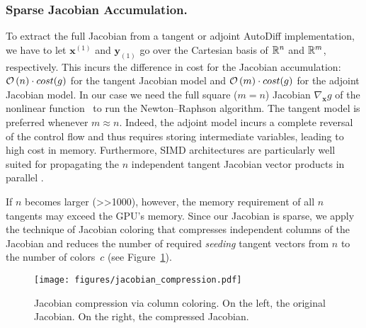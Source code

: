 \subsubsection{Sparse Jacobian Accumulation.}
To extract the full Jacobian from a tangent or adjoint AutoDiff
implementation, we have to let $\bm{x}^{(1)}$ and $\bm{y}_{(1)}$ go over the
Cartesian basis of $\mathbb{R}^n$ and $\mathbb{R}^m$, respectively. This incurs the
difference in cost for the Jacobian accumulation: $\mathcal{O}\left( n \right) \cdot cost(g)$
for the tangent Jacobian model and $\mathcal{O}\left( m \right) \cdot cost(g)$ for the adjoint
Jacobian model. In our case we need the full square ($m=n$) Jacobian $\nabla_{\bm{x}} g$
of the nonlinear function~ to run the Newton--Raphson
algorithm. The tangent model is preferred whenever $m \approx n$.
Indeed, the adjoint model incurs a complete
reversal of the control flow and thus requires storing intermediate variables,
leading to high cost in memory.
Furthermore, SIMD architectures are particularly well suited for propagating
the $n$ independent tangent Jacobian vector products in parallel \cite{revels2018-ixedmode}.

If $n$ becomes larger (>>1000), however, the memory requirement of all $n$
tangents may exceed the GPU's memory. Since our Jacobian is sparse, we apply
the technique of Jacobian coloring that compresses independent columns of
the Jacobian and reduces the number of required {\it seeding} tangent vectors
from $n$ to the number of colors~$c$ (see Figure~\ref{fig:coloring}).


\begin{figure}
  \centering
\texttt{[image: figures/jacobian\_compression.pdf]}
\caption{Jacobian compression via column coloring. On the left, the original Jacobian.
On the right, the compressed Jacobian.}
\label{fig:coloring}
\end{figure}


